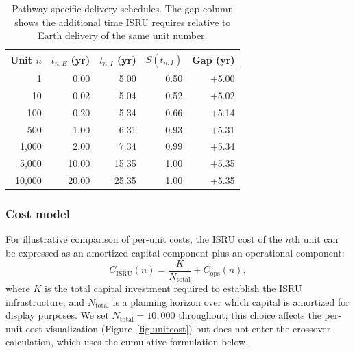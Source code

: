 \documentclass[preprint,12pt]{elsarticle}
\begin{document}
\begin{table}[htbp]
\centering
\caption{Pathway-specific delivery schedules. The gap column shows the additional time ISRU requires relative to Earth delivery of the same unit number.}
\label{tab:production_schedule}
\small
\begin{tabular}{@{}rrrrr@{}}
\toprule
Unit $n$ & $t_{n,E}$ (yr) & $t_{n,I}$ (yr) & $S(t_{n,I})$ & Gap (yr) \\
\midrule
1      & 0.00  & 5.00  & 0.50 & $+$5.00 \\
10     & 0.02  & 5.04  & 0.52 & $+$5.02 \\
100    & 0.20  & 5.34  & 0.66 & $+$5.14 \\
500    & 1.00  & 6.31  & 0.93 & $+$5.31 \\
1{,}000  & 2.00  & 7.34  & 0.99 & $+$5.34 \\
5{,}000  & 10.00 & 15.35 & 1.00 & $+$5.35 \\
10{,}000 & 20.00 & 25.35 & 1.00 & $+$5.35 \\
\bottomrule
\end{tabular}
\end{table}

\subsubsection{Cost model}

For illustrative comparison of per-unit costs, the ISRU cost of the $n$th unit can be expressed as an amortized capital component plus an operational component:
\begin{equation}
  C_{\mathrm{ISRU}}(n) = \frac{K}{N_{\mathrm{total}}} + C_{\mathrm{ops}}(n),
  \label{eq:isru_unit}
\end{equation}
where $K$ is the total capital investment required to establish the ISRU infrastructure, and $N_{\mathrm{total}}$ is a planning horizon over which capital is amortized for display purposes. We set $N_{\mathrm{total}} = 10{,}000$ throughout; this choice affects the per-unit cost visualization (Figure~\ref{fig:unitcost}) but does not enter the crossover calculation, which uses the cumulative formulation below.
\end{document}
